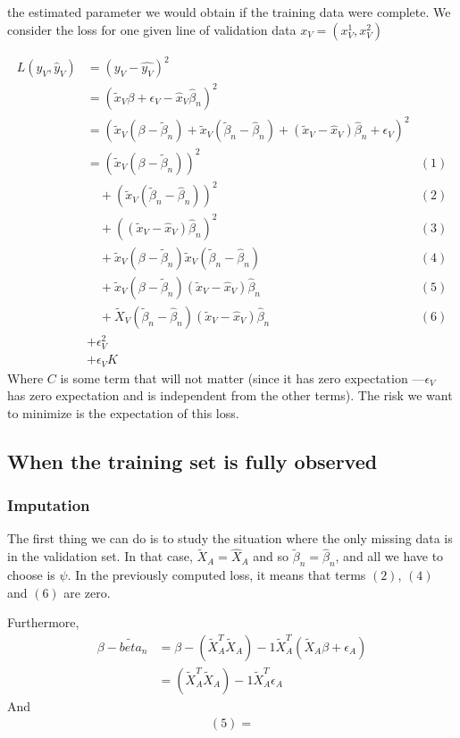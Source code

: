 the estimated parameter we would obtain if the training data were complete. We consider the loss for one given line of validation data $x_V = (x_V^1, x_V^2)$

\begin{align*}
L(y_V, \hat{y}_V) &= (y_V - \hat{y_V})^2 &\\
				   &= (\tilde{x}_V \beta + \epsilon_V - \hat{x}_V \hat{\beta}_n)^2 &\\
				   &= (\tilde{x}_V(\beta - \tilde{\beta}_n) + \tilde{x}_V (\tilde{\beta}_n - \hat{\beta}_n) + (\tilde{x}_V - \hat{x}_V) \hat{\beta}_n + \epsilon_V)^2 & \\
				   &= (\tilde{x}_V (\beta - \tilde{\beta}_n))^2 & (1) \\
				   & \quad + (\tilde{x}_V (\tilde{\beta}_n-\hat{\beta}_n))^2 &(2) \\
				   & \quad + ((\tilde{x}_V - \hat{x}_V) \hat{\beta}_n)^2 &(3) \\
				   & \quad + \tilde{x}_V (\beta - \tilde{\beta}_n) \tilde{x}_V (\tilde{\beta}_n - \hat{\beta}_n) & (4) \\
				   & \quad + \tilde{x}_V (\beta - \tilde{\beta}_n) (\tilde{x}_V - \hat{x}_V )\hat{\beta}_n & (5) \\
				   & \quad + \tilde{X}_V (\tilde{\beta}_n - \hat{\beta}_n) (\tilde{x}_V - \hat{x}_V) \hat{\beta}_n & (6)\\
				   & + \epsilon_V^2 &\\
				   & + \epsilon_V K
\end{align*}
Where $C$ is some term that will not matter (since it has zero expectation ---$\epsilon_V$ has zero expectation and is independent from the other terms). The risk we want to minimize is the expectation of this loss.
		\subsection{When the training set is fully observed}
			\subsubsection{Imputation}
The first thing we can do is to study the situation where the only missing data is in the validation set. In that case, $\tilde{X}_A = \hat{X}_A$ and so $\tilde{\beta}_n = \hat{\beta}_n$, and all we have to choose is $\psi$. In the previously computed loss, it means that terms $(2)$, $(4)$ and $(6)$ are zero.

Furthermore, 
\begin{align*}
\beta -\tilde{beta}_n &= \beta - (\tilde{X}_A^T \tilde{X}_A)-1 \tilde{X}_A^T (\tilde{X}_A \beta + \epsilon_A)\\
					&= (\tilde{X}_A^T \tilde{X}_A)-1 \tilde{X}_A^T \epsilon_A
\end{align*}
And 
\begin{align*}
(5) =  
\end{align*}

